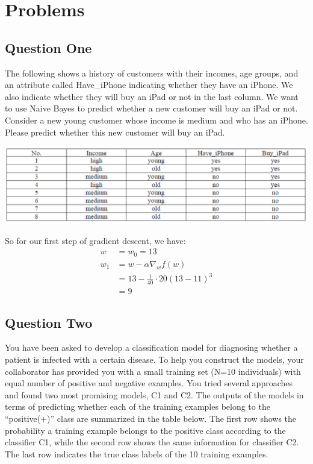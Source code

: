 \section{Problems}

\subsection{Question One}

The following shows a history of customers with their incomes, age groups, and an attribute called Have\_iPhone indicating whether they have an iPhone. We also indicate whether they will buy an iPad or not in the last column. We want to use Naive Bayes to predict whether a new customer will buy an iPad or not. Consider a new young customer whose income is medium and who has an iPhone. Please predict whether this new customer will buy an iPad.

\includegraphics[width=1\textwidth]{media/hw5_q1.png}

So for our first step of gradient descent, we have:
\begin{align}
    w &= w_0 = 13 \label{eq:q1_2} \nonumber \\
    w_1 &= w - \alpha \nabla_w f(w) \nonumber \\
    &= 13 - \frac{1}{40} \cdot 20(13-11)^3 \nonumber \\
    &= 9
\end{align}

\subsection{Question Two}
You have been asked to develop a classification model for diagnosing whether a patient is infected with a certain disease. To help you construct the models, your collaborator has provided you with a small training set (N=10 individuals) with equal number of positive and negative examples. You tried several approaches and found two most promising models, C1 and C2. The outputs of the models in terms of predicting whether each of the training examples belong to the “positive(+)” class are summarized in the table below. The first row shows the probability a training example belongs to the positive class according to the classifier C1, while the second row shows the same information for classifier C2. The last row indicates the true class labels of the 10 training examples.

